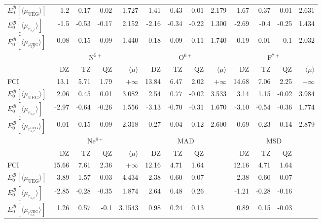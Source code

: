 \documentclass[aip,jcp,reprint,noshowkeys,superscriptaddress]{revtex4-1}
\newcommand{\basis}[0]{\mathcal{B}}
\newcommand{\muuegav}{\langle \mu_{\text{UEG}}\rangle}
\newcommand{\muav}{\langle \mu\rangle}
\newcommand{\murscav}{\langle \mu_{r_{s,c}}\rangle}
\newcommand{\mursclda}{\langle \mu_{r_{s,c}^{\text{UEG}}}\rangle}
\begin{document}
\begin{table*}
\begin{ruledtabular}
\begin{tabular}{l|rrr|r||rrr|r||rrr|r|}
$E_0^{\basis}[\muuegav]$ &  1.2    &   0.17   & -0.02   &1.727     &  1.41   &   0.43   &  -0.01  &2.179     &  1.67   &   0.37   &  0.01  &2.631        \\  
$E_0^{\basis}[\murscav]$ &  -1.5   &  -0.53   & -0.17   &2.152     &  -2.16  &  -0.34   &  -0.22  &1.300     &  -2.69  &  -0.4    & -0.25  &1.434        \\  
$E_0^{\basis}[\mursclda]$&  -0.08  &  -0.15   & -0.09   &1.440     &  -0.18  &   0.09   &  -0.11  &1.740     &  -0.19  &   0.01   &  -0.1  &2.032        \\  
\hline              
                         &\multicolumn{4}{c}{N$^{5+}$}   & \multicolumn{4}{c}{O$^{6+}$}            & \multicolumn{4}{c}{F$^{7+}$}    \\
                         &   DZ    &  TZ      &   QZ     & $\muav$ &  DZ     &   TZ    &  QZ     & $\muav$&   DZ    &   TZ     &  QZ    & $\muav$  \\
\hline              
 FCI                     &  13.1   &   5.71   &  1.79    &$+\infty$  &  13.84  &   6.47  &  2.02   &$+\infty$ &  14.68  &   7.06   &  2.25   &$+\infty$   \\  
$E_0^{\basis}[\muuegav]$ &  2.06   &   0.45   &  0.01    &3.082      &  2.54   &   0.77  & -0.02   &3.533     &  3.14   &   1.15   & -0.02   &3.984       \\  
$E_0^{\basis}[\murscav]$ &  -2.97  &  -0.64   &  -0.26   &1.556      & -3.13   &  -0.70  & -0.31   &1.670     & -3.10   &  -0.54   & -0.36   &1.774       \\  
$E_0^{\basis}[\mursclda]$&  -0.01  &  -0.15   &  -0.09   &2.318      &  0.27   &  -0.04  & -0.12   &2.600     &  0.69   &   0.23   & -0.14   &2.879       \\  
\hline              
                         &\multicolumn{4}{c}{Ne$^{8+}$}  & \multicolumn{4}{c}{MAD} & \multicolumn{4}{c}{MSD}    \\
                         &   DZ    &  TZ      &   QZ     & $\muav$ &  DZ     &   TZ     &  QZ     &          &   DZ    &   TZ     &  QZ    &            \\
\hline              
 FCI                     &  15.66  &   7.61   &  2.36    &$+\infty$  & 12.16   &    4.71  &    1.64 &          &  12.16   &   4.71   &    1.64&             \\   
$E_0^{\basis}[\muuegav]$ &  3.89   &   1.57   &  0.03    &4.434      & 2.38    &    0.60  &    0.07 &          &   2.38   &   0.60   &    0.07&             \\   
$E_0^{\basis}[\murscav]$ &  -2.85  &  -0.28   & -0.35    &1.874      & 2.64    &    0.48  &    0.26 &          &  -1.21   &  -0.28   &   -0.16&             \\   
$E_0^{\basis}[\mursclda]$&  1.26   &   0.57   & -0.1     &3.1543     & 0.98    &    0.24  &    0.13 &          &   0.89   &   0.15   &   -0.03&             \\   
\end{tabular}
\end{ruledtabular}
\end{table*}
\end{document}

